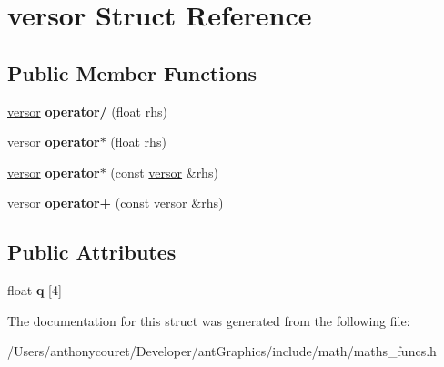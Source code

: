 \hypertarget{structversor}{\section{versor Struct Reference}
\label{structversor}
}
\subsection*{Public Member Functions}
\begin{DoxyCompactItemize}
\item 
\hypertarget{structversor_a42bf73265a1411e514bfe7d4d440a151}{\hyperlink{structversor}{versor} {\bfseries operator/} (float rhs)}\label{structversor_a42bf73265a1411e514bfe7d4d440a151}

\item 
\hypertarget{structversor_afd1dbdd4f20912ea116bb8917f18bcad}{\hyperlink{structversor}{versor} {\bfseries operator$\ast$} (float rhs)}\label{structversor_afd1dbdd4f20912ea116bb8917f18bcad}

\item 
\hypertarget{structversor_a86ac9a5e478f52bec5e155ab5b4d73a2}{\hyperlink{structversor}{versor} {\bfseries operator$\ast$} (const \hyperlink{structversor}{versor} \&rhs)}\label{structversor_a86ac9a5e478f52bec5e155ab5b4d73a2}

\item 
\hypertarget{structversor_af9555b1a9f091ae59125fd04894f0979}{\hyperlink{structversor}{versor} {\bfseries operator+} (const \hyperlink{structversor}{versor} \&rhs)}\label{structversor_af9555b1a9f091ae59125fd04894f0979}

\end{DoxyCompactItemize}
\subsection*{Public Attributes}
\begin{DoxyCompactItemize}
\item 
\hypertarget{structversor_adc671ad0000c2b8b2bdd332ce2070284}{float {\bfseries q} \mbox{[}4\mbox{]}}\label{structversor_adc671ad0000c2b8b2bdd332ce2070284}

\end{DoxyCompactItemize}


The documentation for this struct was generated from the following file\+:\begin{DoxyCompactItemize}
\item 
/\+Users/anthonycouret/\+Developer/ant\+Graphics/include/math/maths\+\_\+funcs.\+h\end{DoxyCompactItemize}
